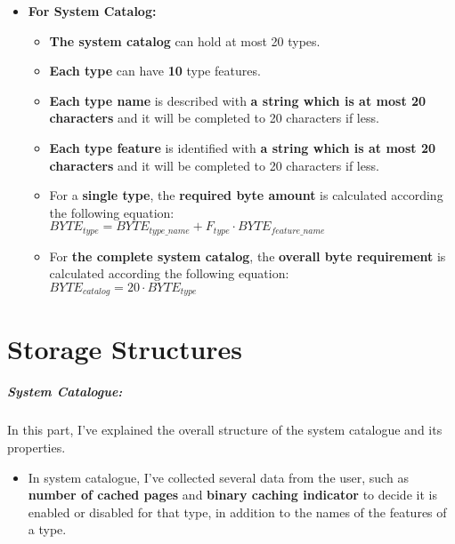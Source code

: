 \documentclass[12pt]{report}
\begin{document}
\begin{itemize}
\item{\large \textbf{For System Catalog:}}
\begin{itemize}
\item \textbf{The system catalog} can hold at most 20 types.
\item \textbf{Each type} can have \textbf{10} type features.
\item \textbf{Each type name} is described with \textbf{a string which is at most 20 characters} and it will be completed to 20 characters if less.
\item \textbf{Each type feature} is identified with \textbf{a string which is at most 20 characters} and it will be completed to 20 characters if less.
\item For a \textbf{single type}, the \textbf{required byte amount} is calculated according the following equation: \\
$BYTE_{type} = BYTE_{type\_name} + F_{type}\cdot{BYTE_{feature\_name}}$ 
\item For \textbf{the complete system catalog}, the \textbf{overall byte requirement} is calculated according the following equation: \\
$BYTE_{catalog} = 20 \cdot BYTE_{type}$
\end{itemize}
\end{itemize}

\chapter{Storage Structures}
\paragraph{System Catalogue:}
In this part, I've explained the overall structure of the system catalogue and its properties. \\	

\begin{itemize}
\item In system catalogue, I've collected several data from the user, such as \textbf{number of cached pages} and \textbf{binary caching indicator} to decide it is enabled or disabled for that type, in addition to the names of the features of a type.
\end{itemize}
\end{document}
